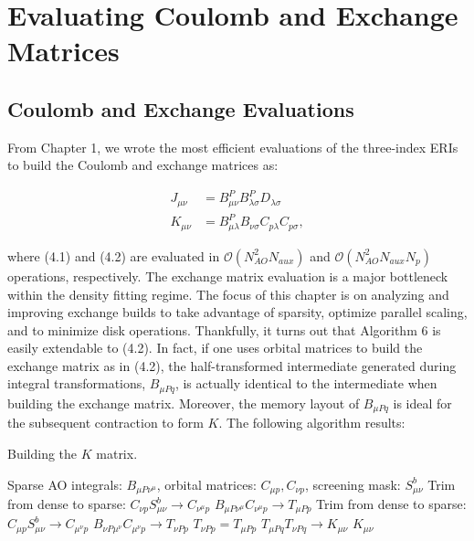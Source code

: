 \chapter{Evaluating Coulomb and Exchange Matrices}

\section{Coulomb and Exchange Evaluations}

From Chapter 1, we wrote the most efficient evaluations of the three-index ERIs to build the Coulomb and exchange matrices as:

\begin{align}
J_{\mu \nu} &= B_{\mu \nu}^P B_{\lambda \sigma}^PD_{\lambda \sigma} \\
K_{\mu \nu} &= B_{\mu \lambda}^P B_{\nu \sigma}C_{p\lambda}C_{p\sigma},
\end{align}

\noindent where (4.1) and (4.2) are evaluated in $\mathcal{O}(N_{AO}^2N_{aux})$ and $\mathcal{O}(N_{AO}^2N_{aux}N_p)$ operations, respectively.
The exchange matrix evaluation is a major bottleneck within the density fitting regime. The focus of this chapter is on analyzing and improving
exchange builds to take advantage of sparsity, optimize parallel scaling, and to minimize disk operations.
Thankfully, it turns out that Algorithm 6 is easily 
extendable to (4.2). In fact, if one uses orbital matrices to build the exchange matrix as in (4.2), the half-transformed 
intermediate generated during integral transformations, $B_{\mu Pq}$, is actually identical to the intermediate when building the exchange matrix. 
Moreover, the memory layout of $B_{\mu Pq}$ is ideal for the subsequent contraction to form $K$. The following algorithm results:

\begin{algorithm}[H]
\caption{Building the $K$ matrix.}
\begin{algorithmic}
\REQUIRE Sparse AO integrals: $B_{\mu P \nu^\mu}$, orbital matrices: $C_{\mu p}, C_{\nu p}$, screening mask: $S_{\mu \nu}^b$
    \STATE Trim from dense to sparse: $C_{\nu p}S_{\mu \nu}^b \rightarrow C_{\nu^{\mu} p}$
    \STATE $B_{\mu P \nu^{\mu}} C_{\nu^{\mu} p} \rightarrow T_{\mu Pp}$
        \STATE Trim from dense to sparse: $C_{\mu p}S_{\mu \nu}^b \rightarrow C_{\mu^{\nu} p}$
        \STATE $B_{\nu P \mu^{\nu}} C_{\mu^{\nu} p} \rightarrow T_{\nu P p}$
    \ELSE
        \STATE $T_{\nu P p} = T_{\mu P p}$ 
    \ENDIF
\ENDFOR
\STATE $T_{\mu P q} T_{\nu P q} \rightarrow K_{\mu \nu} $
\RETURN $K_{\mu \nu}$
\end{algorithmic}
\end{algorithm}

